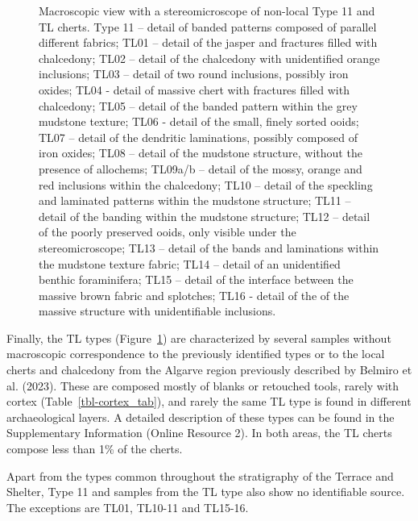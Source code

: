 \documentclass[
  a4paper,
  DIV=11,
  numbers=noendperiod]{scrreprt}
\begin{document}
\begin{figure}


\caption{\label{fig-small-types}Macroscopic view with a stereomicroscope
of non-local Type 11 and TL cherts. Type 11 -- detail of banded patterns
composed of parallel different fabrics; TL01 -- detail of the jasper and
fractures filled with chalcedony; TL02 -- detail of the chalcedony with
unidentified orange inclusions; TL03 -- detail of two round inclusions,
possibly iron oxides; TL04 - detail of massive chert with fractures
filled with chalcedony; TL05 -- detail of the banded pattern within the
grey mudstone texture; TL06 - detail of the small, finely sorted ooids;
TL07 -- detail of the dendritic laminations, possibly composed of iron
oxides; TL08 -- detail of the mudstone structure, without the presence
of allochems; TL09a/b -- detail of the mossy, orange and red inclusions
within the chalcedony; TL10 -- detail of the speckling and laminated
patterns within the mudstone structure; TL11 -- detail of the banding
within the mudstone structure; TL12 -- detail of the poorly preserved
ooids, only visible under the stereomicroscope; TL13 -- detail of the
bands and laminations within the mudstone texture fabric; TL14 -- detail
of an unidentified benthic foraminifera; TL15 -- detail of the interface
between the massive brown fabric and splotches; TL16 - detail of the of
the massive structure with unidentifiable inclusions.}

\end{figure}%

Finally, the TL types (Figure~\ref{fig-small-types}) are characterized
by several samples without macroscopic correspondence to the previously
identified types or to the local cherts and chalcedony from the Algarve
region previously described by Belmiro et al. (2023). These are composed
mostly of blanks or retouched tools, rarely with cortex
(Table~\ref{tbl-cortex_tab}), and rarely the same TL type is found in
different archaeological layers. A detailed description of these types
can be found in the Supplementary Information (Online Resource 2). In
both areas, the TL cherts compose less than 1\% of the cherts.

Apart from the types common throughout the stratigraphy of the Terrace
and Shelter, Type 11 and samples from the TL type also show no
identifiable source. The exceptions are TL01, TL10-11 and TL15-16.
\end{document}

